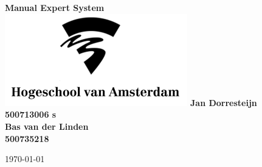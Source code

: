 \begin{titlepage}
  \centering
    \vfill
    {\bfseries\Huge
      Manual Expert System\\
        \vskip2cm
      }
    \includegraphics[height=4cm]{images/hva-logo-png-7.png} %
    \vfill
      {\bfseries\Large
      Jan Dorresteijn  \\
      }
      {
        \bfseries\normalsize
        500713006 s\\
        \vskip1cm
        }
      {\bfseries\Large
        Bas van der Linden \\
      }
      {
        \bfseries\normalsize
        500735218\\
        \vskip1cm
    }    
    \vfill

    \today\\

\end{titlepage}
\newpage